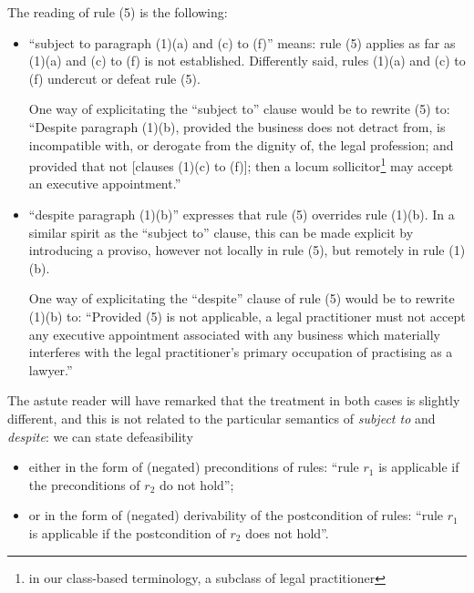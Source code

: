 The reading of rule (5) is the following:
\begin{itemize}
\item ``subject to paragraph (1)(a) and (c) to (f)'' means: rule (5) applies
  as far as (1)(a) and (c) to (f) is not established. Differently said, rules
  (1)(a) and (c) to (f) undercut or defeat rule (5).

  One way of explicitating the ``subject to'' clause would be to rewrite (5)
  to: ``Despite paragraph (1)(b), provided the business does not detract from,
  is incompatible with, or derogate from the dignity of, the legal profession;
  and provided that not [clauses (1)(c) to (f)]; then a locum
  sollicitor\footnote{in our class-based terminology, a subclass of legal
    practitioner} may accept an executive appointment.''

\item ``despite paragraph (1)(b)'' expresses that rule (5) overrides rule
  (1)(b). In a similar spirit as the ``subject to'' clause, this can be made
  explicit by introducing a proviso, however not locally in  rule (5), but
  remotely in rule (1)(b).

  One way of explicitating the ``despite'' clause of rule (5) would be to
  rewrite (1)(b) to: ``Provided (5) is not applicable, a legal practitioner
  must not accept any executive appointment associated with any business which
  materially interferes with the legal practitioner’s primary occupation of
  practising as a lawyer.''
\end{itemize}

The astute reader will have remarked that the treatment in both cases is
slightly different, and this is not related to the particular semantics of
\emph{subject to} and \emph{despite}: we can state defeasibility
\begin{itemize}
\item either in the form of (negated) preconditions of rules: ``rule $r_1$ is
  applicable if the preconditions of $r_2$ do not hold'';
\item or in the form of (negated) derivability of the postcondition of rules: ``rule $r_1$ is
  applicable if the postcondition of $r_2$ does not hold''.
\end{itemize}



